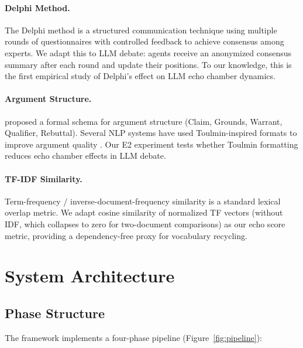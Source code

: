\documentclass[11pt]{article}
\begin{document}
\paragraph{Delphi Method.}
The Delphi method \citep{dalkey1963experimental} is a structured communication technique using multiple rounds of questionnaires with controlled feedback to achieve consensus among experts. We adapt this to LLM debate: agents receive an anonymized consensus summary after each round and update their positions. To our knowledge, this is the first empirical study of Delphi's effect on LLM echo chamber dynamics.

\paragraph{Argument Structure.}
\citet{toulmin1958uses} proposed a formal schema for argument structure (Claim, Grounds, Warrant, Qualifier, Rebuttal). Several NLP systems have used Toulmin-inspired formats to improve argument quality \citep{stab2014identifying}. Our E2 experiment tests whether Toulmin formatting reduces echo chamber effects in LLM debate.

\paragraph{TF-IDF Similarity.}
Term-frequency / inverse-document-frequency similarity \citep{salton1988term} is a standard lexical overlap metric. We adapt cosine similarity of normalized TF vectors (without IDF, which collapses to zero for two-document comparisons) as our echo score metric, providing a dependency-free proxy for vocabulary recycling.

\section{System Architecture}
\label{sec:arch}

\subsection{Phase Structure}

The framework implements a four-phase pipeline (Figure~\ref{fig:pipeline}):
\end{document}
